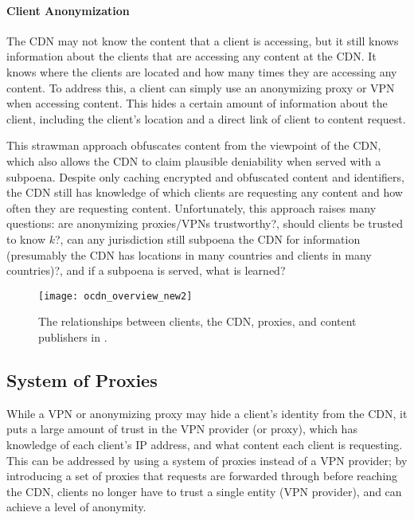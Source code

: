 \paragraph{Client Anonymization}  The CDN may not know the content that a client is accessing, but it 
still knows information about the clients that are accessing any content at the CDN.  It knows 
where the clients are located and how many times they are accessing any content.  To address this, 
a client can simply use an anonymizing proxy or VPN when accessing content.  This hides a certain 
amount of information about the client, including the client's location and a direct link of 
client to content request.

This strawman approach obfuscates content from the viewpoint of the CDN, which also allows the CDN 
to claim plausible deniability when served with a subpoena.  Despite only caching encrypted and obfuscated 
content and identifiers, the CDN still has knowledge of which clients are requesting any content and how often 
they are requesting content.  Unfortunately, this approach raises 
many questions: are anonymizing proxies/VPNs trustworthy?, should clients be trusted to know $k$?, 
can any jurisdiction still subpoena the CDN for information (presumably the CDN has locations in many 
countries and clients in many countries)?, and if a subpoena is served, what is learned?

\begin{figure}[t!]
\centering
\texttt{[image: ocdn\_overview\_new2]}
\caption{The relationships between clients, the CDN, proxies, and content publishers in 
\system{}.}
\label{fig:ocd_overview}
\end{figure}

\subsection{System of Proxies}
\label{sec:proxies}

While a VPN or anonymizing proxy may hide a client's identity from the CDN, it puts a large amount of trust in the VPN provider (or proxy), which 
has knowledge of each client's IP address, and what content each client is requesting.  This can be addressed 
by using a system of proxies instead of a VPN provider; by introducing a set of proxies that requests are 
forwarded through before reaching the CDN, clients no longer have to trust a single entity (VPN provider), and 
can achieve a level of anonymity.

